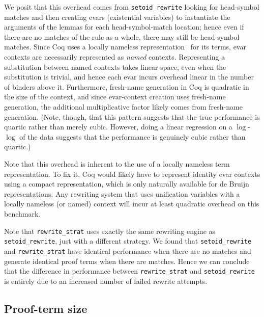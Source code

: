 \documentclass[a4paper,USenglish,cleveref,autoref,thm-restate]{lipics-v2021}
\newcommand{\todo}[1]{\textcolor{red}{\textbf{TODO: #1}}}
\begin{document}
\begin{minipage}[t][1cm]{\textwidth}
We posit that this overhead comes from \texttt{setoid_rewrite} looking for head-symbol matches and then creating evars (existential variables) to instantiate the arguments of the lemmas for each head-symbol-match location; hence even if there are no matches of the rule as a whole, there may still be head-symbol matches.
Since Coq uses a locally nameless representation~\cite{LocallyNameless} for its terms, evar contexts are necessarily represented as \emph{named} contexts.
Representing a substitution between named contexts takes linear space, even when the substitution is trivial, and hence each evar incurs overhead linear in the number of binders above it.
Furthermore, fresh-name generation in Coq is quadratic in the size of the context, and since evar-context creation uses fresh-name generation, the additional multiplicative factor likely comes from fresh-name generation.
(Note, though, that this pattern suggests that the true performance is quartic rather than merely cubic.
However, doing a linear regression on a $\log$-$\log$ of the data suggests that the performance is genuinely cubic rather than quartic.)

Note that this overhead is inherent to the use of a locally nameless term representation.
To fix it, Coq would likely have to represent identity evar contexts using a compact representation, which is only naturally available for de Bruijn representations.
Any rewriting system that uses unification variables with a locally nameless (or named) context will incur at least quadratic overhead on this benchmark.

Note that \texttt{rewrite_strat} uses exactly the same rewriting engine as \texttt{setoid_rewrite}, just with a different strategy.
We found that \texttt{setoid_rewrite} and \texttt{rewrite_strat} have identical performance when there are no matches and generate identical proof terms when there are matches.
Hence we can conclude that the difference in performance between \texttt{rewrite_strat} and \texttt{setoid_rewrite} is entirely due to an increased number of failed rewrite attempts.

\subsection{Proof-term size}


\end{minipage}
\end{document}
